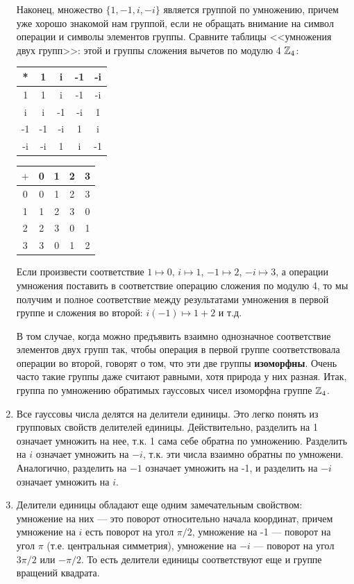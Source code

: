 \begin{enumerate}
Наконец, множество $\{1,-1,i,-i\}$ является группой по умножению, причем уже хорошо знакомой нам группой, если не обращать внимание на символ операции и символы элементов группы. Сравните таблицы <<умножения двух групп>>: этой и группы сложения вычетов по модулю 4 $\mathbb Z_4$:
\begin{center}
\begin{tabular}{c||c|c|c|c|}
* & 1 & i & -1 & -i\\
\hline\hline
1 & 1 & i & -1 & -i\\ \hline
i & i & -1 & -i & 1 \\ \hline
-1 & -1 & -i & 1 & i \\ \hline
-i & -i & 1 & i & -1 \\ \hline
\end{tabular}
\qquad
\begin{tabular}{c||c|c|c|c|}
$+$ &0 & 1 & 2 & 3\\
\hline\hline
0 &0 & 1 & 2 & 3\\ \hline
1 &1 & 2 & 3 & 0 \\ \hline
2 &2 & 3 & 0 & 1 \\ \hline
3 &3 & 0 & 1 & 2\\ \hline
\end{tabular}
\end{center}

Если произвести соответствие $1\mapsto 0$, $i\mapsto 1$, $-1\mapsto 2$, $-i\mapsto 3$, а операции умножения поставить в соответствие операцию сложения по модулю 4, то мы получим и полное соответствие между результатами умножения в первой группе и сложения во второй: $i(-1)\mapsto 1+2$ и т.д.

В том случае, когда можно предъявить взаимно однозначное соответствие элементов двух групп так, чтобы операция в первой группе соответствовала операции во второй, говорят о том, что эти две группы \textbf{изоморфны}. Очень часто такие группы даже считают равными, хотя природа у них разная. Итак, группа по умножению обратимых гауссовых чисел изоморфна группе $\mathbb Z_4$.


\item Все гауссовы числа делятся на делители единицы. Это легко понять из групповых свойств делителей единицы. Действительно, разделить на 1 означает умножить на нее, т.к. 1 сама себе обратна по умножению. Разделить на $i$ означает умножить на $-i$, т.к. эти числа взаимно обратны по умножени. Аналогично, разделить на $-1$ означает умножить на -1, и разделить на $-i$ означает умножить на $i$.

\item Делители единицы обладают еще одним замечательным свойством: умножение на них --- это поворот относительно начала координат, причем умножение на $i$ есть поворот на угол $\pi/2$, умножение на -1 --- поворот на угол $\pi$ (т.е. центральная симметрия), умножение на $-i$ --- поворот на угол $3\pi/2$ или $-\pi/2$. То есть делители единицы соответствуют еще и группе вращений квадрата.



\end{enumerate}
